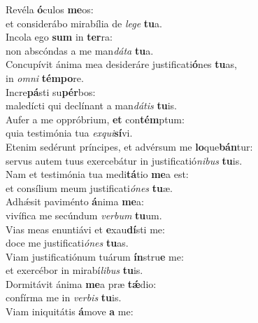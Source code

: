 \evenverse Revéla \textbf{ó}culos \textbf{me}os:~\*\\
\evenverse et considerábo mirabília de \textit{le}\textit{ge} \textbf{tu}a.\\
\oddverse Incola ego \textbf{sum} in \textbf{ter}ra:~\*\\
\oddverse non abscóndas a me man\textit{dá}\textit{ta} \textbf{tu}a.\\
\evenverse Concupívit ánima mea desideráre justificati\textbf{ó}nes \textbf{tu}as,~\*\\
\evenverse in \textit{om}\textit{ni} \textbf{tém}\textbf{po}re.\\
\oddverse Incre\textbf{pá}sti su\textbf{pér}bos:~\*\\
\oddverse maledícti qui declínant a man\textit{dá}\textit{tis} \textbf{tu}is.\\
\evenverse Aufer a me oppróbrium, \textbf{et} con\textbf{tém}ptum:~\*\\
\evenverse quia testimónia tua \textit{ex}\textit{qui}\textbf{sí}vi.\\
\oddverse Etenim sedérunt príncipes, et advérsum me \textbf{lo}que\textbf{bán}tur:~\*\\
\oddverse servus autem tuus exercebátur in justificatió\textit{ni}\textit{bus} \textbf{tu}is.\\
\evenverse Nam et testimónia tua medi\textbf{tá}tio \textbf{me}a est:~\*\\
\evenverse et consílium meum justificati\textit{ó}\textit{nes} \textbf{tu}æ.\\
\oddverse Adhǽsit paviménto \textbf{á}nima \textbf{me}a:~\*\\
\oddverse vivífica me secúndum \textit{ver}\textit{bum} \textbf{tu}um.\\
\evenverse Vias meas enuntiávi et \textbf{e}xau\textbf{dí}sti me:~\*\\
\evenverse doce me justificati\textit{ó}\textit{nes} \textbf{tu}as.\\
\oddverse Viam justificatiónum tuárum \textbf{ín}stru\textbf{e} me:~\*\\
\oddverse et exercébor in mirabí\textit{li}\textit{bus} \textbf{tu}is.\\
\evenverse Dormitávit ánima \textbf{me}a præ \textbf{tǽ}dio:~\*\\
\evenverse confírma me in \textit{ver}\textit{bis} \textbf{tu}is.\\
\oddverse Viam iniquitátis \textbf{á}move \textbf{a} me:~\*\\
